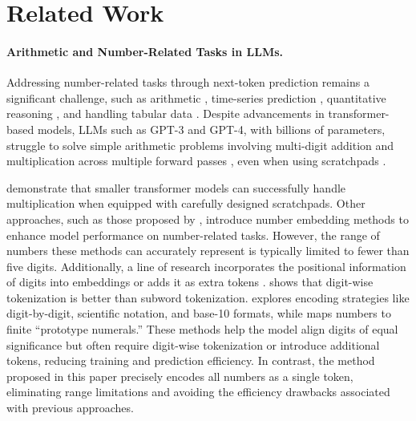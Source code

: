 \section{Related Work}




\paragraph{Arithmetic and Number-Related Tasks in LLMs.}
Addressing number-related tasks through next-token prediction remains a significant challenge, such as arithmetic \cite{saxton2019analysing, yu2023metamath, meidani2023snip},  time-series prediction \cite{tan2024language,merrill2024language,ma2024survey, zhou2023one,liu2024taming,jin2023time}, quantitative reasoning \cite{mcleish2024benchmarking,liu2024llms,chen2023theoremqa,jin2024cladder,cobbe2021training}, and handling tabular data \cite{gao2024raw,fang2024large,sahakyan2021explainable}.
Despite advancements in transformer-based models, LLMs such as GPT-3 and GPT-4, with billions of parameters, struggle to solve simple arithmetic problems involving multi-digit addition and multiplication across multiple forward passes \cite{dziri2024faith, feng2024numerical}, even when using scratchpads \cite{nye2021show}. 

\citet{lee2023teaching} demonstrate that smaller transformer models can successfully handle multiplication when equipped with carefully designed scratchpads.
Other approaches, such as those proposed by \citet{golkar2023xval, sundararaman2020methods, jiang2019learning,sivakumar2024leverage}, introduce number embedding methods to enhance model performance on number-related tasks. However, the range of numbers these methods can accurately represent is typically limited to fewer than five digits.
Additionally, a line of research \cite{mcleish2024transformers, shen2023positional} incorporates the positional information of digits into embeddings or adds it as extra tokens \cite{nogueira2021investigating}. \citet{zhou2024scaling} shows that digit-wise tokenization is better than subword tokenization. \citet{thawani2021representing} explores encoding strategies like digit-by-digit, scientific notation, and base-10 formats, while \citet{jiang2019learning} maps numbers to finite ``prototype numerals.'' These methods help the model align digits of equal significance but often require digit-wise tokenization or introduce additional tokens, reducing training and prediction efficiency.
In contrast, the method proposed in this paper precisely encodes all numbers as a single token, eliminating range limitations and avoiding the efficiency drawbacks associated with previous approaches.


